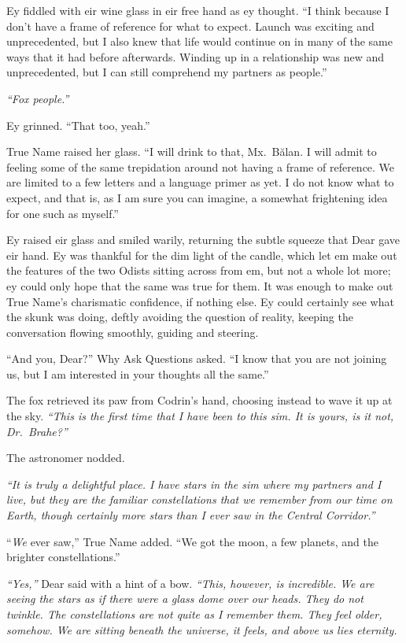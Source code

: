 Ey fiddled with eir wine glass in eir free hand as ey thought. ``I think because I don't have a frame of reference for what to expect. Launch was exciting and unprecedented, but I also knew that life would continue on in many of the same ways that it had before afterwards. Winding up in a relationship was new and unprecedented, but I can still comprehend my partners as people.''

\emph{``Fox people.''}

Ey grinned. ``That too, yeah.''

True Name raised her glass. ``I will drink to that, Mx.~Bălan. I will admit to feeling some of the same trepidation around not having a frame of reference. We are limited to a few letters and a language primer as yet. I do not know what to expect, and that is, as I am sure you can imagine, a somewhat frightening idea for one such as myself.''

Ey raised eir glass and smiled warily, returning the subtle squeeze that Dear gave eir hand. Ey was thankful for the dim light of the candle, which let em make out the features of the two Odists sitting across from em, but not a whole lot more; ey could only hope that the same was true for them. It was enough to make out True Name's charismatic confidence, if nothing else. Ey could certainly see what the skunk was doing, deftly avoiding the question of reality, keeping the conversation flowing smoothly, guiding and steering.

``And you, Dear?'' Why Ask Questions asked. ``I know that you are not joining us, but I am interested in your thoughts all the same.''

The fox retrieved its paw from Codrin's hand, choosing instead to wave it up at the sky. \emph{``This is the first time that I have been to this sim. It is yours, is it not, Dr.~Brahe?''}

The astronomer nodded.

\emph{``It is truly a delightful place. I have stars in the sim where my partners and I live, but they are the familiar constellations that we remember from our time on Earth, though certainly more stars than I ever saw in the Central Corridor.''}

``\emph{We} ever saw,'' True Name added. ``We got the moon, a few planets, and the brighter constellations.''

\emph{``Yes,''} Dear said with a hint of a bow. \emph{``This, however, is incredible. We are seeing the stars as if there were a glass dome over our heads. They do not twinkle. The constellations are not quite as I remember them. They feel older, somehow. We are sitting beneath the universe, it feels, and above us lies eternity.}

